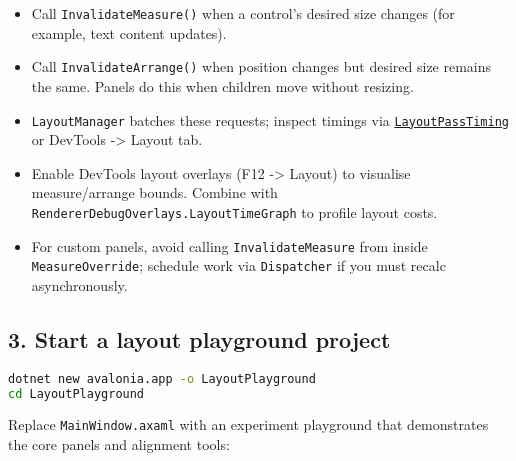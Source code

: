 \begin{itemize}
\tightlist
\item
  Call \passthrough{\lstinline!InvalidateMeasure()!} when a control's
  desired size changes (for example, text content updates).
\item
  Call \passthrough{\lstinline!InvalidateArrange()!} when position
  changes but desired size remains the same. Panels do this when
  children move without resizing.
\item
  \passthrough{\lstinline!LayoutManager!} batches these requests;
  inspect timings via
  \href{https://github.com/AvaloniaUI/Avalonia/blob/master/src/Avalonia.Base/Layout/LayoutPassTiming.cs}{\passthrough{\lstinline!LayoutPassTiming!}}
  or DevTools -\textgreater{} Layout tab.
\item
  Enable DevTools layout overlays (F12 -\textgreater{} Layout) to
  visualise measure/arrange bounds. Combine with
  \passthrough{\lstinline!RendererDebugOverlays.LayoutTimeGraph!} to
  profile layout costs.
\item
  For custom panels, avoid calling
  \passthrough{\lstinline!InvalidateMeasure!} from inside
  \passthrough{\lstinline!MeasureOverride!}; schedule work via
  \passthrough{\lstinline!Dispatcher!} if you must recalc
  asynchronously.
\end{itemize}

\subsection{3. Start a layout playground
project}\label{start-a-layout-playground-project}

\begin{lstlisting}[language=bash]
dotnet new avalonia.app -o LayoutPlayground
cd LayoutPlayground
\end{lstlisting}

Replace \passthrough{\lstinline!MainWindow.axaml!} with an experiment
playground that demonstrates the core panels and alignment tools:


